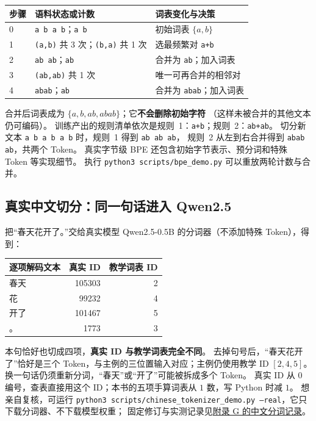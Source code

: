 \begin{center}\small
{}
\begin{tabularx}{\linewidth}{@{}p{11mm}p{47mm}X@{}}
\toprule
步骤 & 语料状态或计数 & 词表变化与决策\\\midrule
0 & \texttt{a b a b}；\texttt{a b} & 初始词表 $\{a,b\}$\\
1 & \texttt{(a,b)} 共 3 次；\texttt{(b,a)} 共 1 次 & 选最频繁对 \texttt{a+b}\\
2 & \texttt{ab ab}；\texttt{ab} & 合并为 \texttt{ab}；加入词表\\
3 & \texttt{(ab,ab)} 共 1 次 & 唯一可再合并的相邻对\\
4 & \texttt{abab}；\texttt{ab} & 合并为 \texttt{abab}；加入词表\\
\bottomrule
\end{tabularx}
\end{center}

合并后词表成为 $\{a,b,ab,abab\}$；它\textbf{不会删除初始字符}
（这样未被合并的其他文本仍可编码）。
训练产出的规则清单依次是规则~1：\texttt{a+b}；规则~2：\texttt{ab+ab}。
切分新文本 \texttt{a b a b a b} 时，规则~1 得到 \texttt{ab ab ab}，
规则~2 从左到右合并得到 \texttt{abab ab}，共两个 Token。
真实字节级 BPE 还包含初始字节表示、预分词和特殊 Token 等实现细节。
执行 \texttt{python3 scripts/bpe\_demo.py} 可以重放两轮计数与合并。

\subsection{真实中文切分：同一句话进入 Qwen2.5}
\label{sec:chinese-tokenization}
\label{experiment:real-chinese-tokenizer}
把“春天花开了。”交给真实模型 Qwen2.5-0.5B 的分词器（不添加特殊 Token），得到：
\begin{center}\small
{}
\begin{tabular}{@{}lrr@{}}\toprule
逐项解码文本 & 真实 ID & 教学词表 ID\\\midrule
春天 & 105303 & 2\\
花 & 99232 & 4\\
开了 & 101467 & 5\\
。 & 1773 & 3\\\bottomrule
\end{tabular}
\end{center}
本句恰好也切成四项，\textbf{真实 ID 与教学词表完全不同}。
去掉句号后，“春天花开了”恰好是三个 Token，与主例的三位置输入对应；主例仍使用教学 ID $[2,4,5]$。
换一句话仍须重新分词，“春天”或“开了”可能被拆成多个 Token。
真实 ID 从 $0$ 编号，查表直接用这个 ID；本书的五项手算词表从 $1$ 数，写 Python 时减 $1$。
想亲自复核，可运行 \texttt{python3 scripts/chinese\_tokenizer\_demo.py --real}，它只下载分词器、不下载模型权重；
固定修订与实测记录见\hyperref[app:tokenizer-record]{附录 G 的中文分词记录}。

